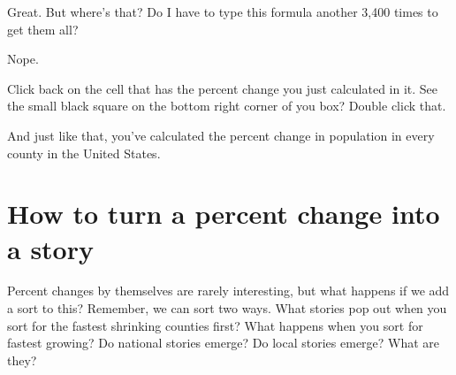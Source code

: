 \documentclass[]{book}
\begin{document}
Great. But where's that? Do I have to type this formula another 3,400 times to get them all?

Nope.

Click back on the cell that has the percent change you just calculated in it. See the small black square on the bottom right corner of you box? Double click that.

And just like that, you've calculated the percent change in population in every county in the United States.

\hypertarget{how-to-turn-a-percent-change-into-a-story}{%
\section{How to turn a percent change into a story}\label{how-to-turn-a-percent-change-into-a-story}}

Percent changes by themselves are rarely interesting, but what happens if we add a sort to this? Remember, we can sort two ways. What stories pop out when you sort for the fastest shrinking counties first? What happens when you sort for fastest growing? Do national stories emerge? Do local stories emerge? What are they?
\end{document}

